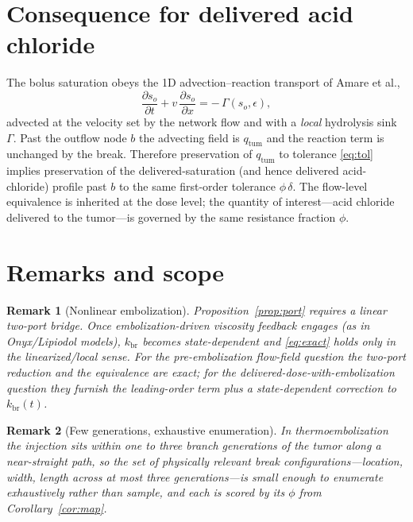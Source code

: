 \documentclass[11pt]{article}
\newtheorem{remark}{Remark}
\newcommand{\kbr}{k_{\mathrm{br}}}
\newcommand{\qtum}{q_{\mathrm{tum}}}
\begin{document}
\section{Consequence for delivered acid chloride}
\label{sec:dose}

The bolus saturation obeys the 1D advection--reaction transport of Amare et al.,
\begin{equation}
\frac{\partial s_o}{\partial t} + v\,\frac{\partial s_o}{\partial x}
= -\,\Gamma(s_o,\epsilon),
\label{eq:transport}
\end{equation}
advected at the velocity set by the network flow and with a \emph{local} hydrolysis
sink $\Gamma$. Past the outflow node $b$ the advecting field is $\qtum$ and the
reaction term is unchanged by the break. Therefore preservation of $\qtum$ to
tolerance \eqref{eq:tol} implies preservation of the delivered-saturation
(and hence delivered acid-chloride) profile past $b$ to the same first-order
tolerance $\phi\,\delta$. The flow-level equivalence is inherited at the dose level;
the quantity of interest---acid chloride delivered to the tumor---is governed by the
same resistance fraction $\phi$.

\section{Remarks and scope}
\label{sec:scope}

\begin{remark}[Nonlinear embolization]
\label{rem:nonlinear}
Proposition~\ref{prop:port} requires a linear two-port bridge. Once
embolization-driven viscosity feedback engages (as in Onyx/Lipiodol models), $\kbr$
becomes state-dependent and \eqref{eq:exact} holds only in the linearized/local
sense. For the pre-embolization \emph{flow-field} question the two-port reduction and
the equivalence are exact; for the \emph{delivered-dose-with-embolization} question
they furnish the leading-order term plus a state-dependent correction to $\kbr(t)$.
\end{remark}

\begin{remark}[Few generations, exhaustive enumeration]
\label{rem:generations}
In thermoembolization the injection sits within one to three branch generations of
the tumor along a near-straight path, so the set of physically relevant break
configurations---location, width, length across at most three generations---is small
enough to enumerate exhaustively rather than sample, and each is scored by its
$\phi$ from Corollary~\ref{cor:map}.
\end{remark}
\end{document}
